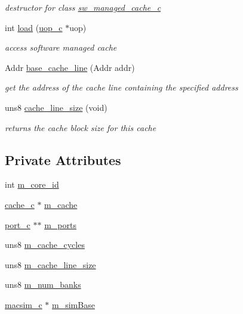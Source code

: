 \begin{DoxyCompactItemize}
\begin{DoxyCompactList}\small\item\em destructor for class \hyperlink{classsw__managed__cache__c}{sw\_\-managed\_\-cache\_\-c} \item\end{DoxyCompactList}\item 
int \hyperlink{classsw__managed__cache__c_a24bc433d77666fdf59696087228d6449}{load} (\hyperlink{classuop__c}{uop\_\-c} $\ast$uop)
\begin{DoxyCompactList}\small\item\em access software managed cache \item\end{DoxyCompactList}\item 
Addr \hyperlink{classsw__managed__cache__c_a60b86580ea31888ce1a204d66ecce975}{base\_\-cache\_\-line} (Addr addr)
\begin{DoxyCompactList}\small\item\em get the address of the cache line containing the specified address \item\end{DoxyCompactList}\item 
uns8 \hyperlink{classsw__managed__cache__c_a98467646d59ac0c727121ae3f5f88d1f}{cache\_\-line\_\-size} (void)
\begin{DoxyCompactList}\small\item\em returns the cache block size for this cache \item\end{DoxyCompactList}\end{DoxyCompactItemize}
\subsection*{Private Attributes}
\begin{DoxyCompactItemize}
\item 
int \hyperlink{classsw__managed__cache__c_a8151061bd7add9729c93ce0d03148ed6}{m\_\-core\_\-id}
\item 
\hyperlink{classcache__c}{cache\_\-c} $\ast$ \hyperlink{classsw__managed__cache__c_a8eb9de675a6e89d05e03aba40c75e25e}{m\_\-cache}
\item 
\hyperlink{classport__c}{port\_\-c} $\ast$$\ast$ \hyperlink{classsw__managed__cache__c_ab27c8a03c50b7e51d6867b980115588b}{m\_\-ports}
\item 
uns8 \hyperlink{classsw__managed__cache__c_a401a29b76dc159085a9fb16674b322de}{m\_\-cache\_\-cycles}
\item 
uns8 \hyperlink{classsw__managed__cache__c_a45f020073ac71e117fc186033f5aa0fa}{m\_\-cache\_\-line\_\-size}
\item 
uns8 \hyperlink{classsw__managed__cache__c_a5487418d498c1f5518e44f35c4e0e6c4}{m\_\-num\_\-banks}
\item 
\hyperlink{classmacsim__c}{macsim\_\-c} $\ast$ \hyperlink{classsw__managed__cache__c_a262d7f694fb4b947870a364b7eb42026}{m\_\-simBase}
\end{DoxyCompactItemize}


